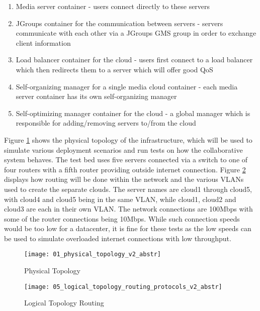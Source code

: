 \begin{enumerate}
	\item Media server container - users connect directly to these servers
	\item JGroups container for the communication between servers - servers communicate with each other via a JGroups GMS group in order to exchange client information
	\item Load balancer container for the cloud - users first connect to a load balancer which then redirects them to a server which will offer good QoS
	\item Self-organizing manager for a single media cloud container - each media server container has its own self-organizing manager
	\item Self-optimizing manager container for the cloud - a global manager which is responsible for adding/removing servers to/from the cloud
\end{enumerate}

Figure \ref{fig:deployment} shows the physical topology of the infrastructure, which will be used to simulate various deployment scenarios and run tests on how the collaborative system behaves. The test bed uses five servers connected via a switch to one of four routers with a fifth router providing outside internet connection. Figure \ref{fig:logicaldeploymentrouting} displays how routing will be done within the network and the various VLANs used to create the separate clouds. The server names are cloud1 through cloud5, with cloud4 and cloud5 being in the same VLAN, while cloud1, cloud2 and cloud3 are each in their own VLAN. The network connections are 100Mbps with some of the router connections being 10Mbps. While such connection speeds would be too low for a datacenter, it is fine for these tests as the low speeds can be used to simulate overloaded internet connections with low throughput.

\begin{figure}
	\centering
		\texttt{[image: 01\_physical\_topology\_v2\_abstr]}
	\caption{Physical Topology}
	\label{fig:deployment}
\end{figure}

\begin{figure}
	\centering
		\texttt{[image: 05\_logical\_topology\_routing\_protocols\_v2\_abstr]}
	\caption{Logical Topology Routing}
	\label{fig:logicaldeploymentrouting}
\end{figure}


